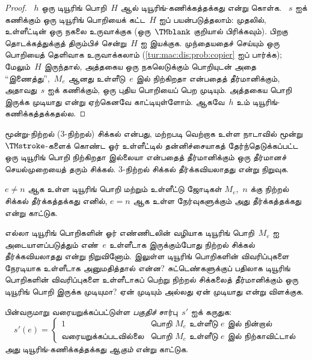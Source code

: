 \documentclass[../../../include/open-logic-section]{subfiles}
\begin{document}
\begin{proof}
~$h$ ஒரு டியூரிங் பொறி~$H$ ஆல் டியூரிங்-கணிக்கத்தக்கது என்று கொள்க.
~$s$ ஐக் கணிக்கும் ஒரு டியூரிங் பொறியைக் கட்ட~$H$ ஐப் பயன்படுத்தலாம்:
முதலில், உள்ளீட்டின் ஒரு நகலை உருவாக்குக (ஒரு~$\TMblank$ குறியால்
பிரிக்கவும்). பிறகு தொடக்கத்துக்குத் திரும்பிச் சென்று~$H$ ஐ இயக்குக.
முந்தையதைச் செய்யும் ஒரு பொறியைத் தெளிவாக உருவாக்கலாம்
(\cref{tur:mac:dis:prob:copier} ஐப் பார்க்க); மேலும்~$H$ இருந்தால்,
அத்தகைய ஒரு நகலெடுக்கும் பொறியுடன் அதை ``இணைத்து'',~$M_e$ ஆனது
உள்ளீடு~$e$ இல் நிற்கிறதா என்பதைத் தீர்மானிக்கும், அதாவது~$s$ ஐக்
கணிக்கும், ஒரு புதிய பொறியைப் பெற முடியும். அத்தகைய பொறி இருக்க
முடியாது என்று ஏற்கெனவே காட்டியுள்ளோம். ஆகவே~$h$ உம்
டியூரிங்-கணிக்கத்தக்கதல்ல.
\end{proof}

\begin{prob}
மூன்று-நிற்றல் (3-நிற்றல்) சிக்கல் என்பது, மற்றபடி வெற்றாக உள்ள
நாடாவில் மூன்று $\TMstroke$-களைக் கொண்ட ஓர் உள்ளீட்டில் தன்னிச்சையாகத்
தேர்ந்தெடுக்கப்பட்ட ஒரு டியூரிங் பொறி நிற்கிறதா இல்லையா என்பதைத்
தீர்மானிக்கும் ஒரு தீர்மானச் செயல்முறையைத் தரும் சிக்கல்.
3-நிற்றல் சிக்கல் தீர்க்கவியலாதது என்று நிறுவுக.
\end{prob}

\begin{prob}
$e \neq n$ ஆக உள்ள டியூரிங் பொறி மற்றும் உள்ளீட்டு ஜோடிகள்
$M_e$,~$n$ க்கு நிற்றல் சிக்கல் தீர்க்கத்தக்கது எனில், $e = n$ ஆக
உள்ள நேர்வுகளுக்கும் அது தீர்க்கத்தக்கது என்று காட்டுக.
\end{prob}

\begin{prob}
எல்லா டியூரிங் பொறிகளின் ஓர் எண்ணிடலின் வழியாக டியூரிங் பொறி~$M_e$
ஐ அடையாளப்படுத்தும் எண்~$e$ உள்ளீடாக இருக்கும்போது நிற்றல் சிக்கல்
தீர்க்கவியலாதது என்று நிறுவினோம்.  இலுள்ள
டியூரிங் பொறிகளின் விவரிப்புகளை நேரடியாக உள்ளீடாக அனுமதித்தால் என்ன?
சுட்டெண்களுக்குப் பதிலாக டியூரிங் பொறிகளின் விவரிப்புகளை உள்ளீடாகப்
பெற்று நிற்றல் சிக்கலைத் தீர்மானிக்கும் ஒரு டியூரிங் பொறி இருக்க
முடியுமா? ஏன் முடியும் அல்லது ஏன் முடியாது என்று விளக்குக.
\end{prob}

\begin{prob} பின்வருமாறு வரையறுக்கப்பட்டுள்ள \emph{பகுதிச்}
  சார்பு~$s'$ ஐக் கருதுக:
  \[
  s'(e) =
  \begin{cases}
    \text{1} & \text{பொறி~$M_e$ உள்ளீடு $e$ இல் நின்றால்}\\
    \text{வரையறுக்கப்படவில்லை} & \text{பொறி~$M_e$ உள்ளீடு $e$ இல் நிற்காவிட்டால்}
  \end{cases}
  \]
  அது டியூரிங்-கணிக்கத்தக்கது \emph{ஆகும்} என்று காட்டுக.
\end{prob}
\end{document}
